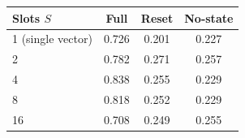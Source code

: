 \begin{tabular}{lccc}
\toprule
Slots $S$ & Full & Reset & No-state\\
\midrule
1 (single vector) & 0.726 & 0.201 & 0.227\\
2 & 0.782 & 0.271 & 0.257\\
4 & 0.838 & 0.255 & 0.229\\
\rowcolor{MemCream}8 & 0.818 & 0.252 & 0.229\\
16 & 0.708 & 0.249 & 0.255\\
\bottomrule
\end{tabular}
